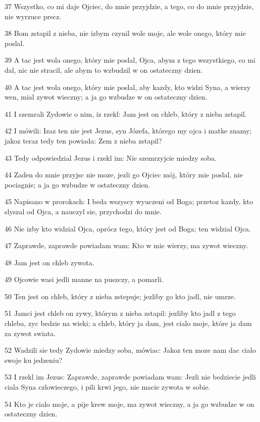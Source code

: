 \par 37 Wszystko, co mi daje Ojciec, do mnie przyjdzie, a tego, co do mnie przyjdzie, nie wyrzuce precz.
\par 38 Bom zstapil z nieba, nie izbym czynil wole moje, ale wole onego, który mie poslal.
\par 39 A tac jest wola onego, który mie poslal, Ojca, abym z tego wszystkiego, co mi dal, nic nie stracil, ale abym to wzbudzil w on ostateczny dzien.
\par 40 A tac jest wola onego, który mie poslal, aby kazdy, kto widzi Syna, a wierzy wen, mial zywot wieczny; a ja go wzbudze w on ostateczny dzien.
\par 41 I szemrali Zydowie o nim, iz rzekl: Jam jest on chleb, który z nieba zstapil.
\par 42 I mówili: Izaz ten nie jest Jezus, syn Józefa, którego my ojca i matke znamy; jakoz teraz tedy ten powiada: Zem z nieba zstapil?
\par 43 Tedy odpowiedzial Jezus i rzekl im: Nie szemrzyjcie miedzy soba.
\par 44 Zaden do mnie przyjsc nie moze, jezli go Ojciec mój, który mie poslal, nie pociagnie; a ja go wzbudze w ostateczny dzien.
\par 45 Napisano w prorokach: I beda wszyscy wyuczeni od Boga; przetoz kazdy, kto slyszal od Ojca, a nauczyl sie, przychodzi do mnie.
\par 46 Nie izby kto widzial Ojca, oprócz tego, który jest od Boga; ten widzial Ojca.
\par 47 Zaprawde, zaprawde powiadam wam: Kto w mie wierzy, ma zywot wieczny.
\par 48 Jam jest on chleb zywota.
\par 49 Ojcowie wasi jedli manne na puszczy, a pomarli.
\par 50 Ten jest on chleb, który z nieba zstepuje; jezliby go kto jadl, nie umrze.
\par 51 Jamci jest chleb on zywy, którym z nieba zstapil: jezliby kto jadl z tego chleba, zyc bedzie na wieki; a chleb, który ja dam, jest cialo moje, które ja dam za zywot swiata.
\par 52 Wadzili sie tedy Zydowie miedzy soba, mówiac: Jakoz ten moze nam dac cialo swoje ku jedzeniu?
\par 53 I rzekl im Jezus: Zaprawde, zaprawde powiadam wam: Jezli nie bedziecie jedli ciala Syna czlowieczego, i pili krwi jego, nie macie zywota w sobie.
\par 54 Kto je cialo moje, a pije krew moje, ma zywot wieczny, a ja go wzbudze w on ostateczny dzien.

